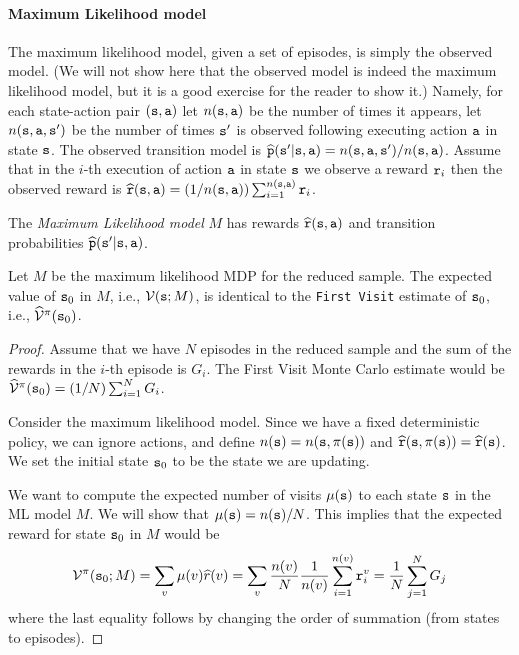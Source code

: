 \begin{advanced}
\paragraph{Maximum Likelihood model} The maximum likelihood model, given a set of episodes, is simply the
observed model. (We will not show here that the observed model is
indeed the maximum likelihood model, but it is a good exercise for the reader to show it.) 
Namely, for each state-action
pair $({\tt s},{\tt a})$ let $n({\tt s},{\tt a})$ be the number of
times it appears, let $n({\tt s},{\tt a},{\tt s}')$ be the number of
times ${\tt s}'$ is observed following executing action ${\tt a}$ in
state ${\tt s}$. The observed transition model is
$\widehat{{\tt p}}({\tt s}'|{\tt s},{\tt a})=n({\tt s},{\tt a},{\tt s}')/n({\tt s},{\tt a})$.
Assume that in the $i$-th execution of action ${\tt a}$ in state
${\tt s}$ we observe a reward ${\tt r}_i$ then the observed reward is
$\widehat{{\tt r}}({\tt s},{\tt a})=(1/n({\tt s},{\tt a}))\sum_{i=1}^{n({\tt s},{\tt a})}
{\tt r}_i$.

\begin{definition}
\label{model:ML}
The \emph{Maximum Likelihood model} $M$ has rewards $\widehat{{\tt r}}({\tt s},{\tt a})$ and transition probabilities $\widehat{{\tt p}}({\tt s}'|{\tt s},{\tt a})$.
\end{definition}

\begin{theorem}
\label{thm:MC-ML}
%
Let $M$ be the maximum likelihood MDP for the reduced sample. The
expected value of ${\tt s}_0$ in $M$, i.e., $\mathcal{V}({\tt s};M)$, is
identical to the {\tt First Visit} estimate of ${\tt s}_0$, i.e.,
$\widehat{\mathcal{V}}^\pi({\tt s}_0)$.
\end{theorem}

\begin{proof}
Assume that we have $N$ episodes in the reduced sample and the sum
of the rewards in the $i$-th episode is $G_i$. The First Visit Monte
Carlo estimate would be
$\widehat{\mathcal{V}}^\pi({\tt s}_0)=(1/N)\sum_{i=1}^N G_i$.

Consider the maximum likelihood model. Since we have a fixed
deterministic policy, we can ignore actions, and define
$n({\tt s})=n({\tt s},\pi({\tt s}))$ and
$\widehat{{\tt r}}({\tt s},\pi({\tt s}))=\widehat{{\tt r}}({\tt s})$.
We set the initial state ${\tt s}_0$ to be the state we are updating.

We want to compute the expected number of visits $\mu({\tt s})$ to
each state ${\tt s}$ in the ML model $M$. We will show that
$\mu({\tt s})=n({\tt s})/N$. This implies that the expected reward for
state ${\tt s}_0$ in $M$ would be
\[
\mathcal{V}^\pi({\tt s}_0;M)=\sum_v \mu(v) \widehat{r}(v)=\sum_v
\frac{n(v)}{N}\frac{1}{n(v)}\sum_{i=1}^{n(v)} {\tt r}_i^v =
\frac{1}{N}\sum_{j=1}^N G_j
\]
where the last equality follows by changing the order of summation
(from states to episodes).


\end{proof}
\end{advanced}
